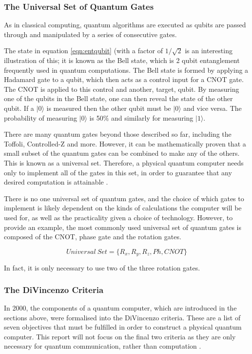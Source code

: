 \subsubsection{The Universal Set of Quantum Gates}
As in classical computing, quantum algorithms are executed as qubits are passed through and manipulated by a series of consecutive gates. 

The state in equation \ref{eqn:entqubit} (with a factor of $1/\sqrt{2}$ is an interesting illustration of this; it is known as the Bell state, which is 2 qubit entanglement frequently used in quantum computations. The Bell state is formed by applying a Hadamard gate to a qubit, which then acts as a control input for a CNOT gate. The CNOT is applied to this control and another, target, qubit. \cite{mermin_quantum_2007} 
By measuring one of the qubits in the Bell state, one can then reveal the state of the other qubit. If a $|0\rangle$ is measured then the other qubit must be $|0\rangle$ and vice versa. The probability of measuring $|0\rangle$ is 50$\%$ and similarly for measuring $|1\rangle$. 

There are many quantum gates beyond those described so far, including the Toffoli, Controlled-Z and more. However, it can be mathematically proven that a small subset of the quantum gates can be combined to make any of the others. This is known as a universal set. Therefore, a physical quantum computer needs only to implement all of the gates in this set, in order to guarantee that any desired computation is attainable \cite{universalset}.

There is no one universal set of quantum gates, and the choice of which gates to implement is likely dependent on the kinds of calculations the computer will be used for, as well as the practicality given a choice of technology. However, to provide an example, the most commonly used universal set of quantum gates is composed of the CNOT, phase gate and the rotation gates.

\begin{equation}
    Universal\ Set = \{ R_x, R_y, R_z, Ph, CNOT \}
\end{equation}

In fact, it is only necessary to use two of the three rotation gates.

\subsubsection{The DiVincenzo Criteria}
In 2000, the components of a quantum computer, which are introduced in the sections above, were formalised into the DiVincenzo criteria. These are a list of seven objectives that must be fulfilled in order to construct a physical quantum computer. This report will not focus on the final two criteria as they are only necessary for quantum communication, rather than computation \cite{bergou_quantum_2021}.

